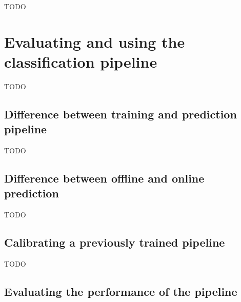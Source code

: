TODO

\section{Evaluating and using the classification pipeline}
\label{sec:processing_signals_evaluating_and_using}



TODO


\subsection{Difference between training and prediction pipeline}
\label{subsec:processing_signals_evaluating_and_using_training_vs_prediction}

TODO


\subsection{Difference between offline and online prediction}
\label{subsec:processing_signals_evaluating_and_using_offline_vs_online}

TODO


\subsection{Calibrating a previously trained pipeline}
\label{subsec:processing_signals_evaluating_and_using_calibration}

TODO


\subsection{Evaluating the performance of the pipeline}
\label{subsec:processing_signals_evaluating_and_using_evaluation}


